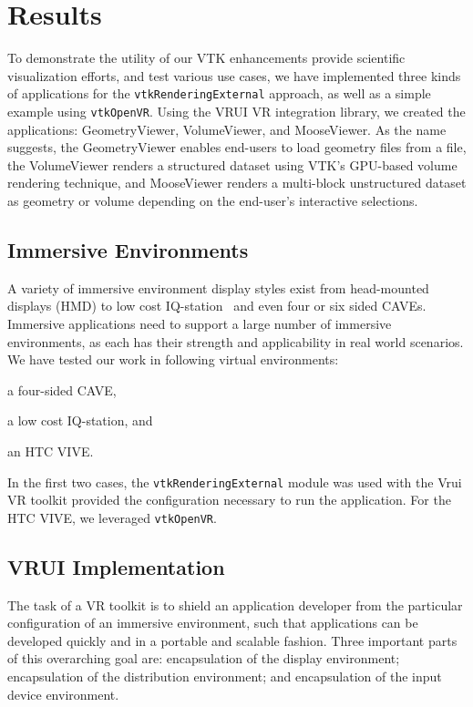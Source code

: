 \section{Results}

To demonstrate the utility of our VTK enhancements provide scientific
visualization efforts, and test various use cases, we have implemented three kinds of
applications for the \texttt{vtkRenderingExternal} approach, as well as
a simple example using \texttt{vtkOpenVR}.
Using the VRUI VR integration library, we created the applications:
GeometryViewer, VolumeViewer, and MooseViewer.
As the name suggests, the GeometryViewer enables end-users to load geometry files from a file, the VolumeViewer renders a structured dataset using VTK's GPU-based volume rendering technique, and MooseViewer renders a multi-block unstructured dataset as geometry or volume depending on the end-user's interactive selections.

\subsection{Immersive Environments}

A variety of immersive environment display styles exist from head-mounted displays (HMD) to low cost IQ-station~\cite{Sherman:2010} and even four or six sided CAVEs. Immersive applications need to support a large number of immersive environments, as each has their strength and applicability in real world scenarios. We have tested our work in following virtual environments: 

\begin{compactitem}
\item a four-sided CAVE,
\item a low cost IQ-station, and 
\item an HTC VIVE.
\end{compactitem}

In the first two cases, the \texttt{vtkRenderingExternal} module was used with the Vrui VR toolkit provided the configuration necessary to run the application. For the HTC VIVE, we leveraged \texttt{vtkOpenVR}. 

\subsection{VRUI Implementation}

The task of a VR toolkit is to shield an application developer from the particular configuration of an immersive environment, such that applications can be developed quickly and in a portable and scalable fashion. Three important parts of this overarching goal are: encapsulation of the display environment; encapsulation of the distribution environment; and encapsulation of the input device environment.

